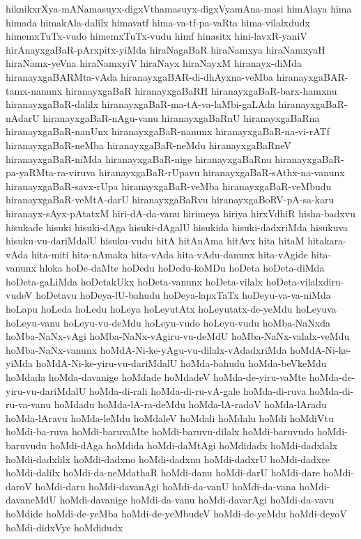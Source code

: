 {hiknikxrXya-mANamasuyx-digxVthamasuyx-digxVyamAna-masi
himAlaya
hima
himada
himakAla-dalilx
himavatf
hima-va-tf-pa-vaRta
hima-vilalxdudx
himemxTuTx-vudo
himemxTuTx-vudu
himf
hinasitx
hini-lavxR-yaniV
hirAnayxgaBaR-pArxpitx-yiMda
hiraNagaBaR
hiraNamxya
hiraNamxyaH
hiraNamx-yeVna
hiraNamxyiV
hiraNayx
hiraNayxM
hiranayx-diMda
hiranayxgaBARMta-vAda
hiranayxgaBAR-di-dhAyxna-veMba
hiranayxgaBAR-tamx-nanunx
hiranayxgaBaR
hiranayxgaBaRH
hiranayxgaBaR-barx-hamxnu
hiranayxgaBaR-dalilx
hiranayxgaBaR-ma-tA-va-laMbi-gaLAda
hiranayxgaBaR-nAdarU
hiranayxgaBaR-nAgu-vanu
hiranayxgaBaRnU
hiranayxgaBaRna
hiranayxgaBaR-nanUnx
hiranayxgaBaR-nanunx
hiranayxgaBaR-na-vi-rATf
hiranayxgaBaR-neMba
hiranayxgaBaR-neMdu
hiranayxgaBaRneV
hiranayxgaBaR-niMda
hiranayxgaBaR-nige
hiranayxgaBaRnu
hiranayxgaBaR-pa-yaRMta-ra-viruva
hiranayxgaBaR-rUpavu
hiranayxgaBaR-sAthx-na-vanunx
hiranayxgaBaR-savx-rUpa
hiranayxgaBaR-veMba
hiranayxgaBaR-veMbudu
hiranayxgaBaR-veMtA-darU
hiranayxgaBaRvu
hiranayxgaBoRV-pA-sa-karu
hiranayx-sAyx-pAtatxM
hiri-dA-da-vanu
hirimeya
hiriya
hirxVdhiR
hisha-badxvu
hisukade
hisuki
hisuki-dAga
hisuki-dAgalU
hisukida
hisuki-dadxriMda
hisukuva
hisuku-vu-dariMdalU
hisuku-vudu
hitA
hitAnAma
hitAvx
hita
hitaM
hitakara-vAda
hita-miti
hita-nAmaka
hita-vAda
hita-vAdu-danunx
hita-vAgide
hita-vanunx
hloka
hoDe-daMte
hoDedu
hoDedu-koMDu
hoDeta
hoDeta-diMda
hoDeta-gaLiMda
hoDetakUkx
hoDeta-vanunx
hoDeta-vilalx
hoDeta-vilalxdiru-vudeV
hoDetavu
hoDeya-lU-bahudu
hoDeya-lapxTaTx
hoDeyu-va-va-niMda
hoLapu
hoLeda
hoLedu
hoLeya
hoLeyutAtx
hoLeyutatx-de-yeMdu
hoLeyuva
hoLeyu-vanu
hoLeyu-vu-deMdu
hoLeyu-vudo
hoLeyu-vudu
hoMba-NaNxda
hoMba-NaNx-vAgi
hoMba-NaNx-vAgiru-vu-deMdU
hoMba-NaNx-valalx-veMdu
hoMba-NaNx-vanunx
hoMdA-Ni-ke-yAgu-vu-dilalx-vAdadxriMda
hoMdA-Ni-ke-yiMda
hoMdA-Ni-ke-yiru-vu-dariMdalU
hoMda-bahudu
hoMda-beVkeMdu
hoMdada
hoMda-davanige
hoMdade
hoMdadeV
hoMda-de-yiru-vaMte
hoMda-de-yiru-vu-dariMdalU
hoMda-di-rali
hoMda-di-ru-vA-gale
hoMda-di-ruva
hoMda-di-ru-va-vanu
hoMdadu
hoMda-lA-ra-deMdu
hoMda-lA-radoV
hoMda-lAradu
hoMda-lAravu
hoMda-leMdu
hoMdaleV
hoMdali
hoMdalu
hoMdi
hoMdiVtu
hoMdi-ba-ruva
hoMdi-baruvaMte
hoMdi-baruvu-dilalx
hoMdi-baruvudo
hoMdi-baruvudu
hoMdi-dAga
hoMdida
hoMdi-daMtAgi
hoMdidadx
hoMdi-dadxlalx
hoMdi-dadxlilx
hoMdi-dadxno
hoMdi-dadxnu
hoMdi-dadxrU
hoMdi-dadxre
hoMdi-dalilx
hoMdi-da-neMdathaR
hoMdi-danu
hoMdi-darU
hoMdi-dare
hoMdi-daroV
hoMdi-daru
hoMdi-davanAgi
hoMdi-da-vanU
hoMdi-da-vana
hoMdi-davaneMdU
hoMdi-davanige
hoMdi-da-vanu
hoMdi-davarAgi
hoMdi-da-vavu
hoMdide
hoMdi-de-yeMba
hoMdi-de-yeMbudeV
hoMdi-de-yeMdu
hoMdi-deyoV
hoMdi-didxVye
hoMdidudx
}
